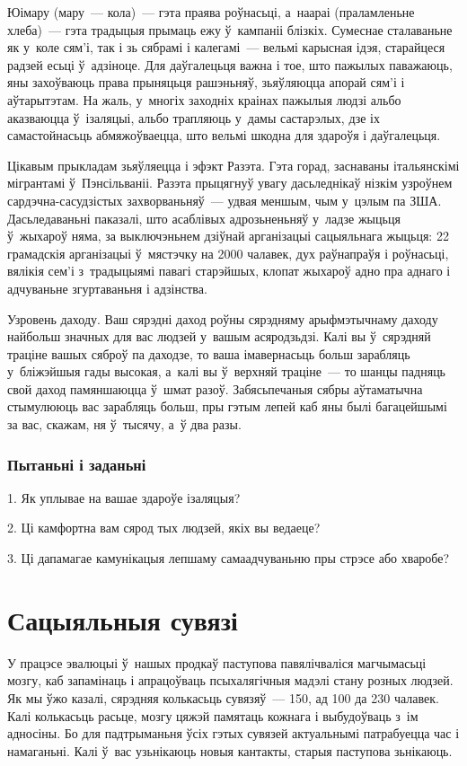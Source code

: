 Юімару (мару~--- кола)~--- гэта праява роўнасьці, а~наараі (праламленьне хлеба)~--- гэта традыцыя прымаць ежу ў~кампаніі блізкіх. Сумеснае сталаваньне як у~коле сям'і, так і зь сябрамі і калегамі~--- вельмі карысная ідэя, старайцеся радзей есьці ў~адзіноце. Для даўгалецьця важна і тое, што пажылых паважаюць, яны захоўваюць права прыняцьця рашэньняў, зьяўляюцца апорай сям'і і аўтарытэтам. На жаль, у~многіх заходніх краінах пажылыя людзі альбо аказваюцца ў~ізаляцыі, альбо трапляюць у~дамы састарэлых, дзе іх самастойнасьць абмяжоўваецца, што вельмі шкодна для здароўя і даўгалецьця.

Цікавым прыкладам зьяўляецца і эфэкт Разэта. Гэта горад, заснаваны італьянскімі мігрантамі ў~Пэнсільваніі. Разэта прыцягнуў увагу дасьледнікаў нізкім узроўнем сардэчна-сасудзістых захворваньняў~--- удвая меншым, чым у~цэлым па ЗША. Дасьледаваньні паказалі, што асаблівых адрозьненьняў у~ладзе жыцьця ў~жыхароў няма, за выключэньнем дзіўнай арганізацыі сацыяльнага жыцьця: 22 грамадскія арганізацыі ў~мястэчку на 2000 чалавек, дух раўнапраўя і роўнасьці, вялікія сем'і з~традыцыямі павагі старэйшых, клопат жыхароў адно пра аднаго і адчуваньне згуртаваньня і адзінства.

Узровень даходу. Ваш сярэдні даход роўны сярэдняму арыфмэтычнаму даходу найбольш значных для вас людзей у~вашым асяродзьдзі. Калі вы ў~сярэдняй траціне вашых сяброў па даходзе, то ваша імавернасьць больш зарабляць у~бліжэйшыя гады высокая, а~калі вы ў~верхняй траціне~--- то шанцы падняць свой даход памяншаюцца ў~шмат разоў. Забясьпечаныя сябры аўтаматычна стымулююць вас зарабляць больш, пры гэтым лепей каб яны былі багацейшымі за вас, скажам, ня ў~тысячу, а~ў два разы.

\subsubsection{Пытаньні і заданьні}

1. Як уплывае на вашае здароўе ізаляцыя?

2. Ці камфортна вам сярод тых людзей, якіх вы ведаеце?

3. Ці дапамагае камунікацыя лепшаму самаадчуваньню пры стрэсе або хваробе?


\section{Сацыяльныя сувязі}

У працэсе эвалюцыі ў~нашых продкаў паступова павялічваліся магчымасьці мозгу, каб запамінаць і апрацоўваць псыхалягічныя мадэлі стану розных людзей. Як мы ўжо казалі, сярэдняя колькасьць сувязяў~--- 150, ад 100 да 230 чалавек. Калі колькасьць расьце, мозгу цяжэй памятаць кожнага і выбудоўваць з~ім адносіны. Бо для падтрыманьня ўсіх гэтых сувязей актуальнымі патрабуецца час і намаганьні. Калі ў~вас узьнікаюць новыя кантакты, старыя паступова зьнікаюць.

